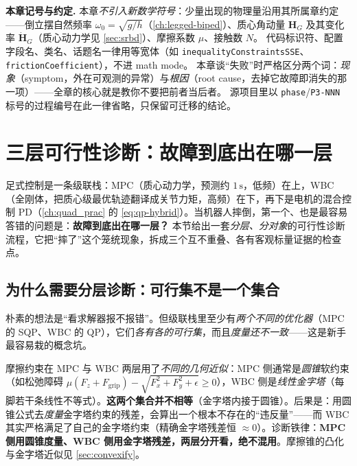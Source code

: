 \begin{note}
\textbf{本章记号与约定.}\;
本章\emph{不引入新数学符号}：少量出现的物理量沿用其所属章约定——倒立摆自然频率 $\omega_0=\sqrt{g/h}$（\cref{ch:legged-biped}）、质心角动量 $\boldsymbol H_G$ 及其变化率 $\dot{\boldsymbol H}_G$（质心动力学见 \cref{sec:srbd}）、摩擦系数 $\mu$、接触数 $N$。
代码标识符、配置字段名、类名、话题名一律用等宽体（如 \texttt{inequalityConstraintsSSE}、\texttt{frictionCoefficient}），不进 math mode。
本章谈“失败”时严格区分两个词：\emph{现象}（symptom，外在可观测的异常）与\emph{根因}（root cause，去掉它故障即消失的那一项）——全章的核心就是教你不要把前者当后者。
源项目里以 \texttt{phase}/\allowbreak\texttt{P3-NNN} 标号的过程编号在此一律省略，只保留可迁移的结论。
\end{note}

\section{三层可行性诊断：故障到底出在哪一层}
\label{sec:ld-three-layer}

足式控制是一条级联栈：MPC（质心动力学，预测约 $1\,\mathrm{s}$，低频）在上，WBC（全刚体，把质心级最优轨迹翻译成关节力矩，高频）在下，再下是电机的混合控制 PD（\cref{ch:quad_prac} 的 \cref{eq:qp-hybrid}）。当机器人摔倒，第一个、也是最容易答错的问题是：\textbf{故障到底出在哪一层？} 本节给出一套\emph{分层、分对象}的可行性诊断流程，它把“摔了”这个笼统现象，拆成三个互不重叠、各有客观标量证据的检查点。

\subsection{为什么需要分层诊断：可行集不是一个集合}
\label{subsec:ld-why-layer}

朴素的想法是“看求解器报不报错”。但级联栈里至少有\emph{两个不同的优化器}（MPC 的 SQP、WBC 的 QP），它们\emph{各有各的可行集}，而且\emph{度量还不一致}——这是新手最容易栽的概念坑。

\begin{insight}\label{ins:ld-pyramid-cone}
摩擦约束在 MPC 与 WBC 两层用了\emph{不同的几何近似}：MPC 侧通常是\emph{圆锥}软约束（如松弛障碍 $\mu(F_z+F_{\mathrm{grip}})-\sqrt{F_x^2+F_y^2+\epsilon}\ge 0$），WBC 侧是\emph{线性金字塔}（每脚若干条线性不等式）。\textbf{这两个集合并不相等}（金字塔内接于圆锥）。后果是：用圆锥公式去\emph{度量}金字塔约束的残差，会算出一个根本不存在的“违反量”——而 WBC 其实严格满足了自己的金字塔约束（精确金字塔残差恒 $\approx 0$）。诊断铁律：\textbf{MPC 侧用圆锥度量、WBC 侧用金字塔残差，两层分开看，绝不混用}。摩擦锥的凸化与金字塔近似见 \cref{sec:convexify}。
\end{insight}

